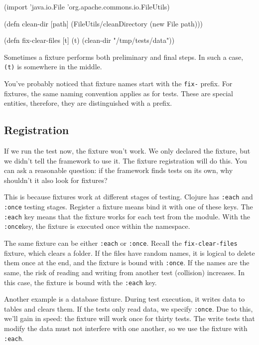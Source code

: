 \else

\begin{english}
  \begin{clojure}
(import 'java.io.File
        'org.apache.commons.io.FileUtils)

(defn clean-dir [path]
  (FileUtils/cleanDirectory (new File path)))

(defn fix-clear-files [t]
  (t)
  (clean-dir "/tmp/tests/data"))
  \end{clojure}
\end{english}

\fi

Sometimes a fixture performs both preliminary and final steps. In such a case, \verb|(t)| is somewhere in the middle.

You've probably noticed that fixture names start with the \verb|fix-| prefix. For fixtures, the same naming convention applies as for tests. These are special entities, therefore, they are distinguished with a prefix.

\subsection{Registration}


If we run the test now, the fixture won't work. We only declared the fixture, but we didn't tell the framework to use it. The fixture registration will do this. You can ask a reasonable question: if the framework finds tests on its own, why shouldn't it also look for fixtures?

This is because fixtures work at different stages of testing. Clojure has \verb|:each| and \verb|:once| testing stages. Register a fixture means bind it with one of these keys. The \verb|:each| key means that the fixture works for each test from the module. With the \verb|:once|key, the fixture is executed once within the namespace.


\mnoindent
The same fixture can be either \verb|:each| or \verb|:once|. Recall the \verb|fix-clear-files| fixture, which clears a folder. If the files have random names, it is logical to delete them once at the end, and the fixture is bound with \verb|:once|. If the names are the same, the risk of reading and writing from another test (collision) increases. In this case, the fixture is bound with the \verb|:each| key.

Another example is a database fixture. During test execution, it writes data to tables and clears them. If the tests only read data, we specify \verb|:once|. Due to this, we'll gain in speed: the fixture will work once for thirty tests. The write tests that modify the data must not interfere with one another, so we use the fixture with \verb|:each|.

